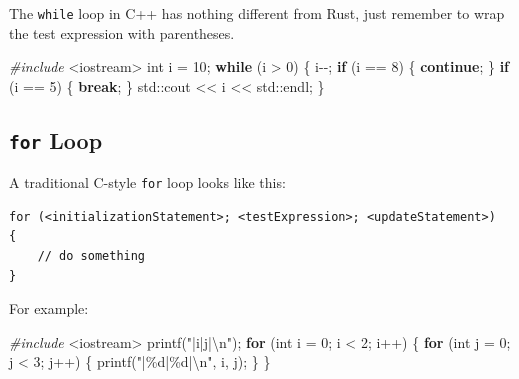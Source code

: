 \documentclass[
]{book}
\newenvironment{Shaded}{\begin{snugshade}}{\end{snugshade}}
\newcommand{\BuiltInTok}[1]{#1}
\newcommand{\ControlFlowTok}[1]{\textcolor[rgb]{0.13,0.29,0.53}{\textbf{#1}}}
\newcommand{\DataTypeTok}[1]{\textcolor[rgb]{0.13,0.29,0.53}{#1}}
\newcommand{\DecValTok}[1]{\textcolor[rgb]{0.00,0.00,0.81}{#1}}
\newcommand{\ImportTok}[1]{#1}
\newcommand{\NormalTok}[1]{#1}
\newcommand{\PreprocessorTok}[1]{\textcolor[rgb]{0.56,0.35,0.01}{\textit{#1}}}
\newcommand{\SpecialCharTok}[1]{\textcolor[rgb]{0.00,0.00,0.00}{#1}}
\newcommand{\StringTok}[1]{\textcolor[rgb]{0.31,0.60,0.02}{#1}}
\begin{document}
The \texttt{while} loop in C++ has nothing different from Rust, just remember to wrap the test expression with parentheses.

\begin{Shaded}
\begin{Highlighting}[]
\PreprocessorTok{\#include }\ImportTok{\textless{}iostream\textgreater{}}
\DataTypeTok{int}\NormalTok{ i = }\DecValTok{10}\NormalTok{;}
\ControlFlowTok{while}\NormalTok{ (i \textgreater{} }\DecValTok{0}\NormalTok{)}
\NormalTok{\{}
\NormalTok{    i{-}{-};}
    \ControlFlowTok{if}\NormalTok{ (i == }\DecValTok{8}\NormalTok{)}
\NormalTok{    \{}
        \ControlFlowTok{continue}\NormalTok{;}
\NormalTok{    \}}
    \ControlFlowTok{if}\NormalTok{ (i == }\DecValTok{5}\NormalTok{)}
\NormalTok{    \{}
        \ControlFlowTok{break}\NormalTok{;}
\NormalTok{    \}}
    \BuiltInTok{std::}\NormalTok{cout \textless{}\textless{} i \textless{}\textless{} }\BuiltInTok{std::}\NormalTok{endl;}
\NormalTok{\}}
\end{Highlighting}
\end{Shaded}

\hypertarget{for-loop}{%
\subsection{\texorpdfstring{\texttt{for} Loop}{for Loop}}\label{for-loop}}

A traditional C-style \texttt{for} loop looks like this:

\begin{verbatim}
for (<initializationStatement>; <testExpression>; <updateStatement>)
{
    // do something
}
\end{verbatim}

For example:

\begin{Shaded}
\begin{Highlighting}[]
\PreprocessorTok{\#include }\ImportTok{\textless{}iostream\textgreater{}}
\NormalTok{printf(}\StringTok{"|i|j|}\SpecialCharTok{\textbackslash{}n}\StringTok{"}\NormalTok{);}
\ControlFlowTok{for}\NormalTok{ (}\DataTypeTok{int}\NormalTok{ i = }\DecValTok{0}\NormalTok{; i \textless{} }\DecValTok{2}\NormalTok{; i++)}
\NormalTok{\{}
    \ControlFlowTok{for}\NormalTok{ (}\DataTypeTok{int}\NormalTok{ j = }\DecValTok{0}\NormalTok{; j \textless{} }\DecValTok{3}\NormalTok{; j++)}
\NormalTok{    \{}
\NormalTok{        printf(}\StringTok{"|}\SpecialCharTok{\%d}\StringTok{|}\SpecialCharTok{\%d}\StringTok{|}\SpecialCharTok{\textbackslash{}n}\StringTok{"}\NormalTok{, i, j);}
\NormalTok{    \}}
\NormalTok{\}}
\end{Highlighting}
\end{Shaded}
\end{document}
